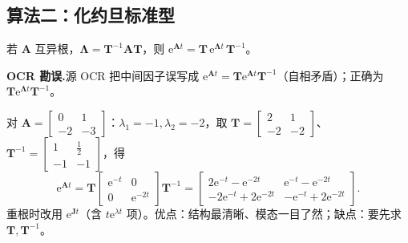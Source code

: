 \subsection{算法二：化约旦标准型}
若 $\mathbf{A}$ 互异根，$\boldsymbol{\Lambda}=\mathbf{T}^{-1}\mathbf{A}\mathbf{T}$，则 $\mathrm{e}^{\mathbf{A}t}=\mathbf{T}\,\mathrm{e}^{\boldsymbol{\Lambda}t}\,\mathbf{T}^{-1}$。
\begin{note}\textbf{OCR 勘误.}\;源 OCR 把中间因子误写成 $\mathrm{e}^{\mathbf{A}t}=\mathbf{T}\mathrm{e}^{\mathbf{A}t}\mathbf{T}^{-1}$（自相矛盾）；正确为 $\mathbf{T}\mathrm{e}^{\boldsymbol{\Lambda}t}\mathbf{T}^{-1}$\cite{liubao2006modern}。\end{note}
对 $\mathbf{A}=\begin{bmatrix}0&1\\-2&-3\end{bmatrix}$：$\lambda_1=-1,\lambda_2=-2$，取 $\mathbf{T}=\begin{bmatrix}2&1\\-2&-2\end{bmatrix}$、$\mathbf{T}^{-1}=\begin{bmatrix}1&\tfrac12\\-1&-1\end{bmatrix}$，得
\begin{equation}
  \mathrm{e}^{\mathbf{A}t}=\mathbf{T}\begin{bmatrix}\mathrm{e}^{-t}&0\\0&\mathrm{e}^{-2t}\end{bmatrix}\mathbf{T}^{-1}
  =\begin{bmatrix}2\mathrm{e}^{-t}-\mathrm{e}^{-2t}&\mathrm{e}^{-t}-\mathrm{e}^{-2t}\\-2\mathrm{e}^{-t}+2\mathrm{e}^{-2t}&-\mathrm{e}^{-t}+2\mathrm{e}^{-2t}\end{bmatrix}.
  \label{eq:ssb-expm-result}
\end{equation}
重根时改用 $\mathrm{e}^{\mathbf{J}t}$（含 $t\mathrm{e}^{\lambda t}$ 项）。优点：结构最清晰、模态一目了然；缺点：要先求 $\mathbf{T},\mathbf{T}^{-1}$。


